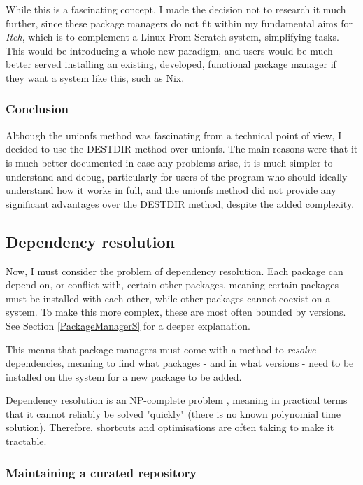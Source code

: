 \documentclass[10pt]{article}
\begin{document}
While this is a fascinating concept, I made the decision not to research it much further, since these package managers do not fit within my fundamental aims for \textit{Itch}, which is to complement a Linux From Scratch system, simplifying tasks. This would be introducing a whole new paradigm, and users would be much better served installing an existing, developed, functional package manager if they want a system like this, such as Nix.

\subsubsection{Conclusion}

Although the unionfs method was fascinating from a technical point of view, I decided to use the DESTDIR method over unionfs. The main reasons were that it is much better documented in case any problems arise, it is much simpler to understand and debug, particularly for users of the program who should ideally understand how it works in full, and the unionfs method did not provide any significant advantages over the DESTDIR method, despite the added complexity.

\subsection{Dependency resolution} \label{DependencySS}

Now, I must consider the problem of dependency resolution. Each package can depend on, or conflict with, certain other packages, meaning certain packages must be installed with each other, while other packages cannot coexist on a system. To make this more complex, these are most often bounded by versions. See Section \ref{PackageManagerS} for a deeper explanation.

This means that package managers must come with a method to \textit{resolve} dependencies, meaning to find what packages - and in what versions - need to be installed on the system for a new package to be added.

Dependency resolution is an NP-complete problem \cite{DependenciesFormal}, meaning in practical terms that it cannot reliably be solved "quickly" (there is no known polynomial time solution). Therefore, shortcuts and optimisations are often taking to make it tractable.

\subsubsection{Maintaining a curated repository}
\end{document}
